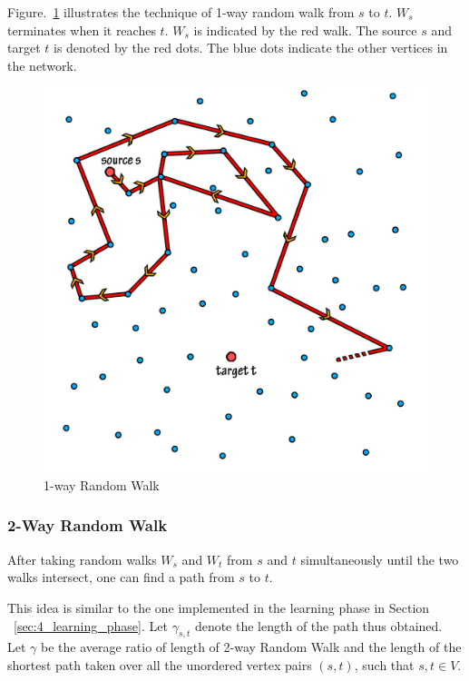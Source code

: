 \documentclass[a4paper,12pt]{article}
\begin{document}
Figure.~\ref{4_one_way} illustrates the technique of 1-way random walk from $s$ to $t$. $W_s$
terminates when it reaches $t$. $W_s$ is indicated by the red walk. The source $s$ 
and target $t$ is denoted by the red dots. The blue dots indicate the other vertices 
in the network. 

\begin{figure}[htp]
\centering
\includegraphics[scale=0.14]{Results/1rawrandomwalk.jpg}
\caption{1-way Random Walk}
\label{4_one_way}
\end{figure}

\subsubsection{2-Way Random Walk}

After taking random walks $W_s$ and $W_t$ from $s$ and $t$ simultaneously 
until the two walks intersect, one can find a path from $s$ to $t$.

This idea is similar to the one implemented in the learning phase in 
Section ~\ref{sec:4_learning_phase}. Let $\gamma_{s,t}$ denote the length of the path thus obtained. 
Let $\gamma$ be the average ratio of length of 2-way Random Walk and the 
length of the shortest path taken over all the unordered vertex pairs $(s,t)$, such that $s,t \in V$.
\end{document}
